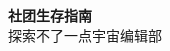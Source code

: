\thispagestyle{empty}  %

\begin{center}
  \vspace*{3cm} %
  {\Huge\bfseries 社团生存指南}\\[1.5cm]
  {\large 探索不了一点宇宙编辑部}\\[3cm]
\end{center}